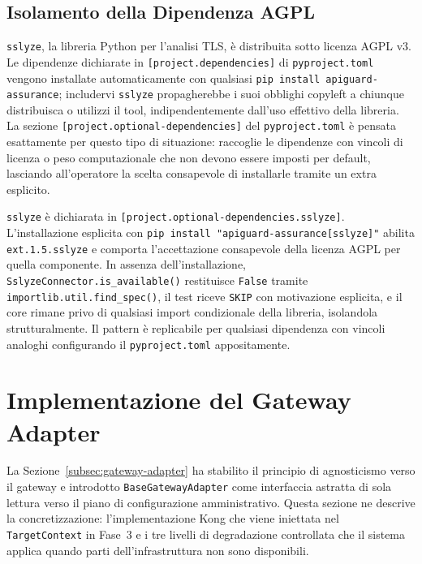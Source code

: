 \subsection{Isolamento della Dipendenza AGPL}\label{subsec:agpl-isolation}

\texttt{sslyze}, la libreria Python per l'analisi \gls{TLS}, è distribuita sotto licenza \gls{AGPL} v3. Le dipendenze dichiarate in \texttt{[project.dependencies]} di \texttt{pyproject.toml} vengono installate automaticamente con qualsiasi \texttt{pip install apiguard-assurance}; includervi \texttt{sslyze} propagherebbe i suoi obblighi copyleft a chiunque distribuisca o utilizzi il tool, indipendentemente dall'uso effettivo della libreria. La sezione \texttt{[project.optional-dependencies]} del \texttt{pyproject.toml} è pensata esattamente per questo tipo di situazione: raccoglie le dipendenze con vincoli di licenza o peso computazionale che non devono essere imposti per default, lasciando all'operatore la scelta consapevole di installarle tramite un extra esplicito.

\texttt{sslyze} è dichiarata in \texttt{[project.optional-dependencies.sslyze]}. L'installazione esplicita con  \texttt{pip install "apiguard-assurance[sslyze]"} abilita \texttt{ext.1.5.sslyze} e comporta l'accettazione consapevole della licenza \gls{AGPL} per quella componente. In assenza dell'installazione, \texttt{SslyzeConnector.is\_available()} restituisce \texttt{False} tramite \texttt{importlib.util.find\_spec()}, il test riceve \texttt{SKIP} con motivazione esplicita, e il core rimane privo di qualsiasi import condizionale della libreria, isolandola strutturalmente.
Il pattern è replicabile per qualsiasi dipendenza con vincoli analoghi configurando il \texttt{pyproject.toml} appositamente.


\section{Implementazione del Gateway Adapter}%
\label{sec:gateway-adapter-impl}

La Sezione~\ref{subsec:gateway-adapter} ha stabilito il principio di agnosticismo verso il gateway e introdotto \texttt{BaseGatewayAdapter} come interfaccia astratta di sola lettura verso il piano di configurazione amministrativo. Questa sezione ne descrive la concretizzazione: l'implementazione Kong che viene iniettata nel \texttt{TargetContext} in Fase~3 e i tre livelli di degradazione controllata che il sistema applica quando parti dell'infrastruttura non sono disponibili.


